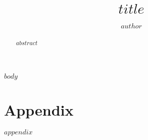 \documentclass{article}
\title{$title$}
\author{$author$}
\begin{document}
\maketitle

\begin{abstract}
$abstract$
\end{abstract}

$body$

\printbibliography

\appendix
\section{Appendix}
$appendix$
\end{document}
